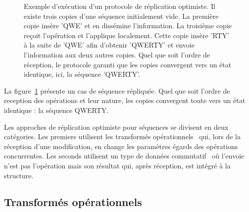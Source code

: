 \begin{figure}
  \centering
  
  \caption{\label{lseq:fig:optimisticexample}Exemple d'exécution d'un protocole
    de réplication optimiste. Il existe trois copies d'une séquence initialement
    vide. La première copie insère 'QWE' et en dissémine l'information. La
    troisième copie reçoit l'opération et l'applique localement. Cette copie
    insère 'RTY' à la suite de 'QWE' afin d'obtenir 'QWERTY' et envoie
    l'information aux deux autres copies. Quel que soit l'ordre de réception, le
    protocole garanti que les copies convergent vers un état identique, ici, la
    séquence 'QWERTY'.}
\end{figure}

La figure~\ref{lseq:fig:optimisticexample} présente un cas de séquence
répliquée. Quel que soit l'ordre de reception des opérations et leur nature, les
copies convergent toute vers un état identique : la séquence QWERTY.

Les approches de réplication optimiste pour séquences se divisent en deux
catégories. Les premiers utilisent les transformés
opérationnels~\cite{sun1998operational, sun2009contextbased} qui, lors de la
réception d'une modification, en change les paramètres égards des opérations
concurrentes. Les seconds utilisent un type de données
commutatif~\cite{shapiro2011comprehensive, shapiro2011conflict} où l'envoie
n'est pas l'opération mais son résultat qui, après réception, est intégré à la
structure.

\subsection{Transformés opérationnels}

